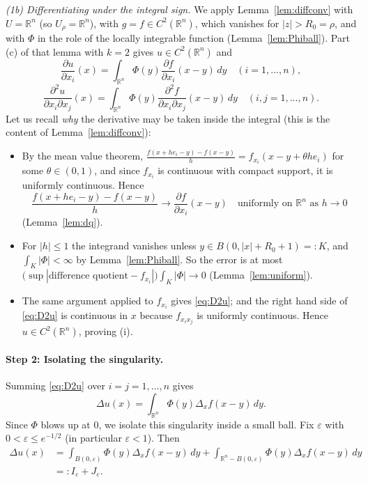 \documentclass[11pt]{article}
\theoremstyle{plain}
\theoremstyle{definition}
\theoremstyle{remark}
\begin{document}
\textit{(1b) Differentiating under the integral sign.} We apply Lemma~\ref{lem:diffconv} with $U = \mathbb{R}^n$ (so $U_\rho = \mathbb{R}^n$), with $g = f \in C^2(\mathbb{R}^n)$, which vanishes for $|z| > R_0 = \rho$, and with $\Phi$ in the role of the locally integrable function (Lemma~\ref{lem:Phiball}). Part (c) of that lemma with $k = 2$ gives $u \in C^2(\mathbb{R}^n)$ and
$$ \frac{\partial u}{\partial x_i}(x) = \int_{\mathbb{R}^n} \Phi(y) \frac{\partial f}{\partial x_i}(x-y)\, dy \quad (i = 1, \dots, n), $$
\begin{equation}\label{eq:D2u}
\frac{\partial^2 u}{\partial x_i \partial x_j}(x) = \int_{\mathbb{R}^n} \Phi(y) \frac{\partial^2 f}{\partial x_i \partial x_j}(x-y)\, dy \quad (i,j = 1, \dots, n).
\end{equation}
Let us recall \emph{why} the derivative may be taken inside the integral (this is the content of Lemma~\ref{lem:diffconv}):
\begin{itemize}
    \item By the mean value theorem, $\frac{f(x+he_i-y) - f(x-y)}{h} = f_{x_i}(x - y + \theta h e_i)$ for some $\theta \in (0,1)$, and since $f_{x_i}$ is continuous with compact support, it is uniformly continuous. Hence
    $$ \frac{f(x+he_i-y) - f(x-y)}{h} \to \frac{\partial f}{\partial x_i}(x-y) \quad \text{uniformly on } \mathbb{R}^n \text{ as } h \to 0 $$
    (Lemma~\ref{lem:dq}).
    \item For $|h| \le 1$ the integrand vanishes unless $y \in B(0, |x| + R_0 + 1) =: K$, and $\int_K |\Phi| < \infty$ by Lemma~\ref{lem:Phiball}. So the error is at most $\big(\sup|\text{difference quotient} - f_{x_i}|\big)\int_K|\Phi| \to 0$ (Lemma~\ref{lem:uniform}).
    \item The same argument applied to $f_{x_i}$ gives \eqref{eq:D2u}; and the right hand side of \eqref{eq:D2u} is continuous in $x$ because $f_{x_ix_j}$ is uniformly continuous. Hence $u \in C^2(\mathbb{R}^n)$, proving (i).
\end{itemize}

\paragraph{Step 2: Isolating the singularity.} Summing \eqref{eq:D2u} over $i = j = 1,\dots,n$ gives
$$ \Delta u(x) = \int_{\mathbb{R}^n} \Phi(y) \Delta_x f(x-y)\, dy. $$
Since $\Phi$ blows up at $0$, we isolate this singularity inside a small ball. Fix $\varepsilon$ with $0 < \varepsilon \leq e^{-1/2}$ (in particular $\varepsilon < 1$). Then
\begin{equation}\label{eq:IJ}
\begin{aligned}
\Delta u(x) &= \int_{B(0,\varepsilon)} \Phi(y) \Delta_x f(x-y)\, dy + \int_{\mathbb{R}^n - B(0,\varepsilon)} \Phi(y)\Delta_x f(x-y)\, dy \\
&=: I_\varepsilon + J_\varepsilon.
\end{aligned}
\end{equation}
\end{document}
